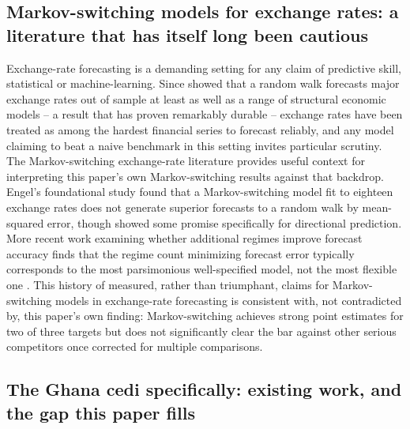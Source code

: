 \documentclass[final,3p,times,authoryear]{elsarticle}
\begin{document}
\subsection{Markov-switching models for exchange rates: a literature
that has itself long been cautious}

Exchange-rate forecasting is a demanding setting for any claim of
predictive skill, statistical or machine-learning. Since
\citet{meeserogoff1983} showed that a random walk forecasts major
exchange rates out of sample at least as well as a range of structural
economic models -- a result that has proven remarkably durable --
exchange rates have been treated as among the hardest financial series
to forecast reliably, and any model claiming to beat a naive benchmark
in this setting invites particular scrutiny. The Markov-switching
exchange-rate literature provides useful context for interpreting this
paper's own Markov-switching results against that backdrop. Engel's
foundational study \citep{engel1994} found that a Markov-switching model
fit to eighteen exchange rates does not generate superior forecasts to a
random walk by mean-squared error, though showed some promise
specifically for directional prediction. More recent work examining
whether additional regimes improve forecast accuracy finds that the
regime count minimizing forecast error typically corresponds to the most
parsimonious well-specified model, not the most flexible one
\citep{regimecount2019}. This history of measured, rather than
triumphant, claims for Markov-switching models in exchange-rate
forecasting is consistent with, not contradicted by, this paper's own
finding: Markov-switching achieves strong point estimates for two of
three targets but does not significantly clear the bar against other
serious competitors once corrected for multiple comparisons.

\subsection{The Ghana cedi specifically: existing work, and the gap this
paper fills}
\end{document}
